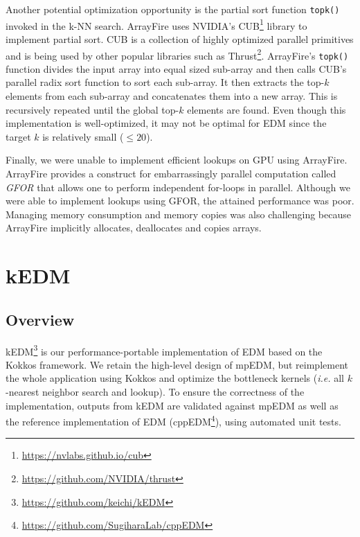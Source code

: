 \documentclass[sigconf]{acmart}
\begin{document}
Another potential optimization opportunity is the partial sort function
\texttt{topk()} invoked in the k-NN search. ArrayFire uses NVIDIA's
CUB\footnote{\url{https://nvlabs.github.io/cub}} library to implement partial
sort. CUB is a collection of highly optimized parallel primitives and is being
used by other popular libraries such
as Thrust\footnote{\url{https://github.com/NVIDIA/thrust}}. ArrayFire's
\texttt{topk()} function divides the input array into equal sized sub-array
and then calls CUB's parallel radix sort function to sort each sub-array. It
then extracts the top-$k$ elements from each sub-array and concatenates them
into a new array. This is recursively repeated until the global top-$k$
elements are found. Even though this implementation is well-optimized, it may
not be optimal for EDM since the target $k$ is relatively small ($\leq 20$).

Finally, we were unable to implement efficient lookups on GPU using ArrayFire.
ArrayFire provides a construct for embarrassingly parallel computation called
\textit{GFOR} that allows one to perform independent for-loops in parallel.
Although we were able to implement lookups using GFOR, the attained
performance was poor. Managing memory consumption and memory copies was also
challenging because ArrayFire implicitly allocates, deallocates and copies
arrays.

\section{kEDM}\label{sec:proposal}


\subsection{Overview}

kEDM\footnote{\url{https://github.com/keichi/kEDM}} is our
performance-portable implementation of EDM based on the Kokkos framework. We retain the high-level design of mpEDM, but
reimplement the whole application using Kokkos and optimize the bottleneck kernels
(\textit{i.e.} all $k$-nearest neighbor search and lookup). To ensure the correctness of the
implementation, outputs from kEDM are validated against mpEDM as well as
the reference implementation of EDM
(cppEDM\footnote{\url{https://github.com/SugiharaLab/cppEDM}}), using automated unit tests.
\end{document}
